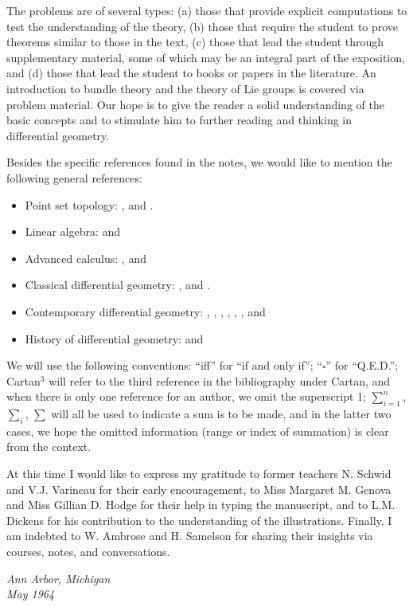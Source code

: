 \documentclass[main]{subfiles}
\begin{document}
The problems are of several types: (a) those that provide explicit computations to test the understanding of the theory, (b) those that require the student to prove theorems similar to those in the text, (c) those that lead the student through supplementary material, some of which may be an integral part of the exposition, and (d) those that lead the student to books or papers in the literature. An introduction to bundle theory and the theory of Lie groups is covered via problem material. Our hope is to give the reader a solid understanding of the basic concepts and to stimulate him to further reading and thinking in differential geometry.

Besides the specific references found in the notes, we would like to mention the following general references: 
\begin{itemize}
    \item Point set topology: \cite{kelley2017general}, \cite{hocking2012topology} and \cite{pervin2014foundations}.
    \item Linear algebra: \cite{halmos2017finite} and \cite{jacobson2013lectures}
    \item Advanced calculus: \cite{buck2003advanced}, \cite{kaplan2003advanced} and \cite{nickerson2013advanced}
    \item Classical differential geometry: \cite{eisenhart2015introduction}, \cite{hilbert1999geometry} and \cite{struik1961lectures}.
    \item Contemporary differential geometry: \cite{auslander2012introduction}, \cite{bishop2011geometry}, \cite{guggenheimer2012differential}, \cite{helgason2012differential}, \cite{kobayashi1963foundations}, \cite{lang2014introduction}, \cite{kobayashi1963foundations} and \cite{sternberg1964lectures} 
    \item History of differential geometry: \cite{struik1961lectures} and \cite{veblen1960foundations}
\end{itemize}

We will use the following conventions: ``iff'' for ``if and only if''; ``$\square$'' for ``Q.E.D.''; Cartan$^3$ will refer to the third reference in the bibliography under Cartan, and when there is only one reference for an author, we omit the superscript 1; $\sum^n_{i=1}$, $\sum_i$, $\sum$ will all be used to indicate a sum is to be made, and in the latter two cases, we hope the omitted information (range or index of summation) is clear from the context.

At this time I would like to express my gratitude to former teachers N. Schwid and V.J. Varineau for their early encouragement, to Miss Margaret M. Genova and Miss Gillian D. Hodge for their help in typing the manuscript, and to L.M. Dickens for his contribution to the understanding of the illustrations. Finally, I am indebted to W. Ambrose and H. Samelson for sharing their insights via courses, notes, and conversations.


{\itshape
\noindent Ann Arbor, Michigan\\
May 1964
}
\end{document}
